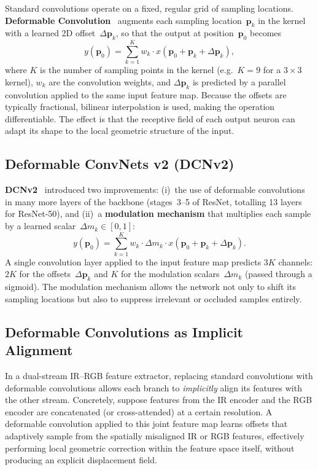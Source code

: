 Standard convolutions operate on a fixed, regular grid of sampling
locations.  \textbf{Deformable Convolution}~\cite{dai2017dcnv1}
augments each sampling location~$\mathbf{p}_k$ in the kernel with a
learned 2D offset~$\Delta\mathbf{p}_k$, so that the output at
position~$\mathbf{p}_0$ becomes
\[
    y(\mathbf{p}_0) = \sum_{k=1}^{K}
        w_k \cdot x(\mathbf{p}_0 + \mathbf{p}_k + \Delta\mathbf{p}_k),
\]
where $K$ is the number of sampling points in the kernel (e.g.\ $K=9$
for a $3\times 3$ kernel), $w_k$ are the convolution weights, and
$\Delta\mathbf{p}_k$ is predicted by a parallel convolution applied to
the same input feature map.  Because the offsets are typically
fractional, bilinear interpolation is used, making the operation
differentiable.  The effect is that the receptive field of each output
neuron can adapt its shape to the local geometric structure of the
input.

\subsection{Deformable ConvNets v2 (DCNv2)}

\textbf{DCNv2}~\cite{zhu2019dcnv2} introduced two improvements: (i)~the
use of deformable convolutions in many more layers of the backbone
(stages~3--5 of ResNet, totalling 13 layers for ResNet-50), and
(ii)~a \textbf{modulation mechanism} that multiplies each sample by a
learned scalar~$\Delta m_k \in [0,1]$:
\[
    y(\mathbf{p}_0) = \sum_{k=1}^{K}
        w_k \cdot \Delta m_k \cdot
        x(\mathbf{p}_0 + \mathbf{p}_k + \Delta\mathbf{p}_k).
\]
A single convolution layer applied to the input feature map predicts
$3K$ channels: $2K$ for the offsets~$\Delta\mathbf{p}_k$ and $K$ for
the modulation scalars~$\Delta m_k$ (passed through a sigmoid).  The
modulation mechanism allows the network not only to shift its sampling
locations but also to suppress irrelevant or occluded samples entirely.

\subsection{Deformable Convolutions as Implicit Alignment}

In a dual-stream IR--RGB feature extractor, replacing standard
convolutions with deformable convolutions allows each branch to
\emph{implicitly} align its features with the other stream.  Concretely,
suppose features from the IR encoder and the RGB encoder are concatenated
(or cross-attended) at a certain resolution.  A deformable convolution
applied to this joint feature map learns offsets that adaptively sample
from the spatially misaligned IR or RGB features, effectively performing
local geometric correction within the feature space itself, without
producing an explicit displacement field.

